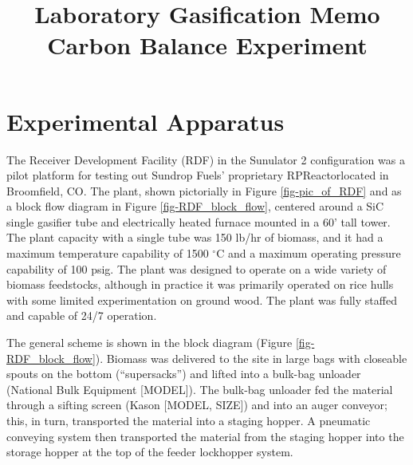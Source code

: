 \documentclass[11pt,twocolumn]{article}
\date{}
\title{Laboratory Gasification Memo\\Carbon Balance Experiment \vspace{-6ex}}
\begin{document}
\twocolumn[
  \begin{@twocolumnfalse}
    \maketitle
    \begin{abstract}
    


    \end{abstract}
  \end{@twocolumnfalse}
]

\section*{Experimental Apparatus}
The Receiver Development Facility (RDF) in the Sunulator 2 configuration was a pilot platform for testing out Sundrop Fuels' proprietary RPReactor\texttrademark located in Broomfield, CO.  The plant, shown pictorially in Figure \ref{fig-pic_of_RDF} and as a block flow diagram in Figure \ref{fig-RDF_block_flow}, centered around a SiC single gasifier tube and electrically heated furnace mounted in a 60' tall tower.  The plant capacity with a single tube was 150 lb/hr of biomass, and it had a maximum temperature capability of 1500 $^{\circ}$C and a maximum operating pressure capability of 100 psig.  The plant was designed to operate on a wide variety of biomass feedstocks, although in practice it was primarily operated on rice hulls with some limited experimentation on ground wood.  The plant was fully staffed and capable of 24/7 operation.  

The general scheme is shown in the block diagram (Figure \ref{fig-RDF_block_flow}).  Biomass was delivered to the site in large bags with closeable spouts on the bottom (``supersacks'') and lifted into a bulk-bag unloader (National Bulk Equipment [MODEL]).  The bulk-bag unloader fed the material through a sifting screen (Kason [MODEL, SIZE]) and into an auger conveyor; this, in turn, transported the material into a staging hopper.  A pneumatic conveying system then transported the material from the staging hopper into the storage hopper at the top of the feeder lockhopper system.  
\end{document}
